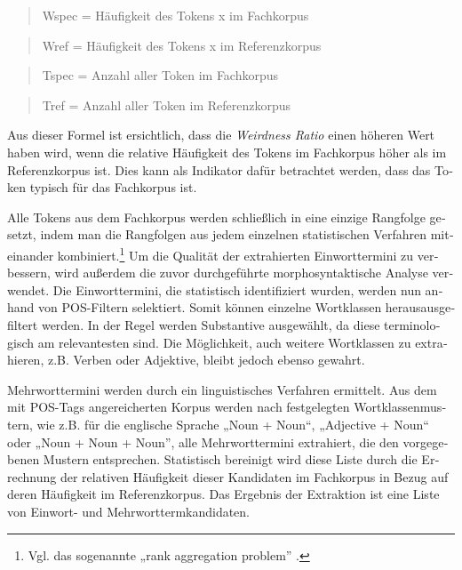 \documentclass[output=paper]{LSP/langsci}
\begin{document}
\begin{otherlanguage}{ngerman}
\begin{quote}
Wspec = Häufigkeit des Tokens x im Fachkorpus
\end{quote}

\begin{quote}
Wref = Häufigkeit des Tokens x im Referenzkorpus 
\end{quote}

\begin{quote}
Tspec = Anzahl aller Token im Fachkorpus
\end{quote}

\begin{quote}
Tref = Anzahl aller Token im Referenzkorpus
\end{quote}


Aus dieser Formel ist ersichtlich, dass die \textit{Weirdness Ratio} einen höheren Wert haben wird, wenn die relative Häufigkeit des Tokens im Fachkorpus höher als im Referenzkorpus ist. Dies kann als Indikator dafür betrachtet werden, dass das Token typisch für das Fachkorpus ist.

Alle Tokens aus dem Fachkorpus werden schließlich in eine einzige Rangfolge gesetzt, indem man die Rangfolgen aus jedem einzelnen statistischen Verfahren miteinander kombiniert.\footnote{Vgl. das sogenannte „rank aggregation problem” \citep{DworkEtAl2001}.} Um die Qualität der extrahierten Einworttermini zu verbessern, wird außerdem die zuvor durchgeführte morphosyntaktische Analyse verwendet. Die Einworttermini, die statistisch identifiziert wurden, werden nun anhand von POS-Filtern selektiert. Somit können einzelne Wortklassen herausausgefiltert werden. In der Regel werden Substantive ausgewählt, da diese terminologisch am relevantesten sind. Die Möglichkeit, auch weitere Wortklassen zu extrahieren, z.B. Verben oder Adjektive, bleibt jedoch ebenso gewahrt. 

Mehrworttermini werden durch ein linguistisches Verfahren ermittelt. Aus dem mit POS-Tags angereicherten Korpus werden nach festgelegten Wortklassenmustern, wie z.B. für die englische Sprache „Noun + Noun“, „Adjective + Noun“ oder „Noun + Noun + Noun”, alle Mehrworttermini extrahiert, die den vorgegebenen Mustern entsprechen. Statistisch bereinigt wird diese Liste durch die Errechnung der relativen Häufigkeit dieser Kandidaten im Fachkorpus in Bezug auf deren Häufigkeit im Referenzkorpus. Das Ergebnis der Extraktion ist eine Liste von Einwort- und Mehrworttermkandidaten.


\end{otherlanguage}
\end{document}
